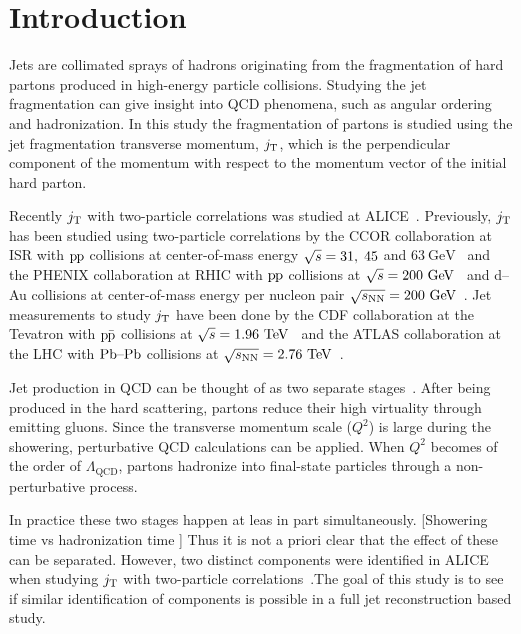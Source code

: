 \linenumbers

\section{Introduction}
\label{sec:introduction}
Jets are collimated sprays of hadrons originating from the fragmentation of hard partons produced in high-energy particle collisions. Studying the jet fragmentation can give insight into QCD phenomena, such as angular ordering~\cite{basicsofpqcd} and hadronization. In this study the fragmentation of partons is studied using the jet fragmentation transverse momentum, $\jt{}$, which is the perpendicular component of the momentum with respect to the momentum vector of the initial hard parton.

Recently $\jt{}$ with two-particle correlations was studied at ALICE~\cite{ALICEjt}. Previously, $\jt{}$ has been studied using two-particle correlations by the CCOR collaboration at ISR with $\pp$ collisions at center-of-mass energy $\sqrtS = 31,\;45$ and $63~\mathrm{GeV}$~\cite{firstjtmeasurement} and the PHENIX collaboration at RHIC with $\pp$ collisions at $\sqrtSE[GeV]{200}$~\cite{PHENIXjets} and d--Au collisions at center-of-mass energy per nucleon pair $\sqrtSnnE[GeV]{200}$~\cite{phenixJtPAu}. Jet measurements to study $\jt{}$ have been done by the CDF collaboration at the Tevatron with $\ppbar$ collisions at $\sqrtSE{1.96}$~\cite{cdfpaper} and the ATLAS collaboration at the LHC with $\PbPb$ collisions at $\sqrtSnnE{2.76}$~\cite{atlaksenJetit}.

Jet production in QCD can be thought of as two separate stages~\cite{eventGenerators}. After being produced in the hard scattering, partons reduce their high virtuality through emitting gluons. Since the transverse momentum scale ($Q^{2}$) is large during the showering, perturbative QCD calculations can be applied. When $Q^{2}$ becomes of the order of $\Lambda_{\mathrm{QCD}}$, partons hadronize into final-state particles through a non-perturbative process. 

In practice these two stages happen at leas in part simultaneously. {\color{red} [Showering time vs hadronization time ]} Thus it is not a priori clear that the effect of these can be separated. However, two distinct components were identified in ALICE when studying $\jt{}$ with two-particle correlations~\cite{ALICEjt}.The goal of this study is to see if similar identification of components is possible in a full jet reconstruction based study. 

